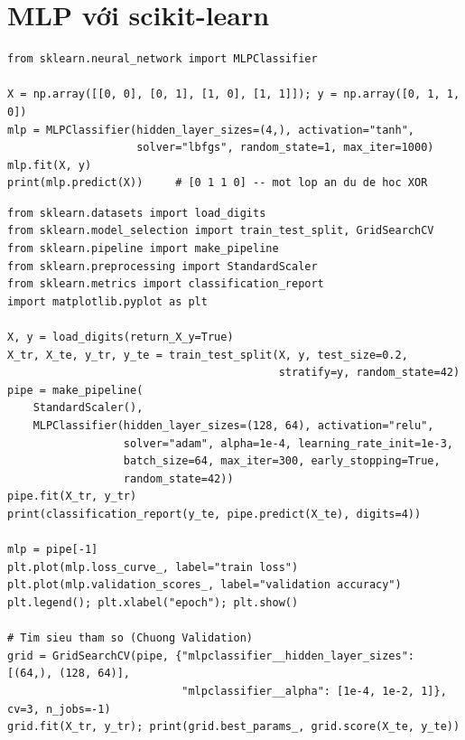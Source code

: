
\section{MLP với scikit-learn}

\begin{lstlisting}[caption={MLPClassifier giải bài toán XOR}]
from sklearn.neural_network import MLPClassifier

X = np.array([[0, 0], [0, 1], [1, 0], [1, 1]]); y = np.array([0, 1, 1, 0])
mlp = MLPClassifier(hidden_layer_sizes=(4,), activation="tanh",
                    solver="lbfgs", random_state=1, max_iter=1000)
mlp.fit(X, y)
print(mlp.predict(X))     # [0 1 1 0] -- mot lop an du de hoc XOR
\end{lstlisting}

\begin{lstlisting}[caption={Phân lớp chữ số viết tay với MLPClassifier}]
from sklearn.datasets import load_digits
from sklearn.model_selection import train_test_split, GridSearchCV
from sklearn.pipeline import make_pipeline
from sklearn.preprocessing import StandardScaler
from sklearn.metrics import classification_report
import matplotlib.pyplot as plt

X, y = load_digits(return_X_y=True)
X_tr, X_te, y_tr, y_te = train_test_split(X, y, test_size=0.2,
                                          stratify=y, random_state=42)
pipe = make_pipeline(
    StandardScaler(),
    MLPClassifier(hidden_layer_sizes=(128, 64), activation="relu",
                  solver="adam", alpha=1e-4, learning_rate_init=1e-3,
                  batch_size=64, max_iter=300, early_stopping=True,
                  random_state=42))
pipe.fit(X_tr, y_tr)
print(classification_report(y_te, pipe.predict(X_te), digits=4))

mlp = pipe[-1]
plt.plot(mlp.loss_curve_, label="train loss")
plt.plot(mlp.validation_scores_, label="validation accuracy")
plt.legend(); plt.xlabel("epoch"); plt.show()

# Tim sieu tham so (Chuong Validation)
grid = GridSearchCV(pipe, {"mlpclassifier__hidden_layer_sizes": [(64,), (128, 64)],
                           "mlpclassifier__alpha": [1e-4, 1e-2, 1]}, cv=3, n_jobs=-1)
grid.fit(X_tr, y_tr); print(grid.best_params_, grid.score(X_te, y_te))
\end{lstlisting}

